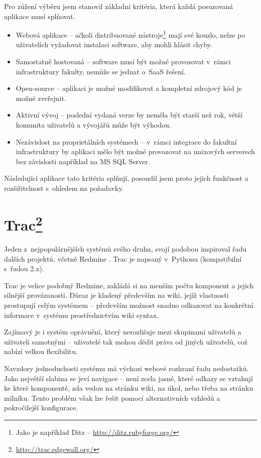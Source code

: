 \documentclass[thesis=B,czech]{FITthesis}[2012/05/02]
\begin{document}
Pro zúžení výběru jsem stanovil základní kritéria, která každá
posuzovaná aplikace musí splňovat.

\begin{itemize}
\item
  Webová aplikace -- ačkoli distribuované nástroje\footnote{Jako je
    například Ditz -- \url{http://ditz.rubyforge.org/}} mají své kouzlo,
  nelze po uživatelích vyžadovat instalaci software, aby mohli hlásit
  chyby.
\item
  Samostatně hostovaná -- software musí být možné provozovat v~rámci
  infrastruktury fakulty, nemůže se jednat o~\gls{SaaS} řešení.
\item
  Open-source -- aplikaci je možné modifikovat a kompletní zdrojový kód
  je možné zveřejnit.
\item
  Aktivní vývoj -- poslední vydaná verze by neměla být starší než rok,
  větší komunita uživatelů a vývojářů může být výhodou.
\item
  Nezávislost na proprietálních systémech -- v~rámci integrace do
  fakultní infrastruktury by aplikaci mělo být možné provozovat na
  unixových serverech bez závislosti například na MS SQL Server.
\end{itemize}
Následující aplikace tato kritéria splňují, posoudil jsem proto jejich
funkčnost a rozšiřitelnost s~ohledem na požadavky.

\section[Trac]{Trac\footnote{\url{http://trac.edgewall.org/}}}

Jeden z~nejpopulárnějších systémů svého druhu, svojí podobou inspiroval
řadu dalších projektů, včetně Redmine \citep{TracRedMine}. Trac je
napsaný v~Pythonu (kompatibilní s~řadou 2.x).

Trac je velice podobný Redmine, zakládá si na menším počtu komponent a
jejich silnější provázanosti. Důraz je kladený především na wiki, jejíž
vlastnosti prostupují celým systémem -- především možnost snadno
odkazovat na konkrétní informace v~systému prostřednictvím wiki syntax.

Zajímavý je i systém oprávnění, který nerozlišuje mezi skupinami
uživatelů a uživateli samotnými -- uživatelé tak mohou dědit práva od
jiných uživatelů, což nabízí velkou flexibilitu.

Navzdory jednoduchosti systému má výchozí webové rozhraní řadu
nedostatků. Jako největší slabina se jeví navigace -- není zcela jasné,
které odkazy se vztahují ke které komponentě, zda vedou na stránku wiki,
na úkol, nebo třeba na stránku milníku. Tento problém však lze řešit
pomocí alternativních vzhledů a pokročilejší konfigurace.
\end{document}
